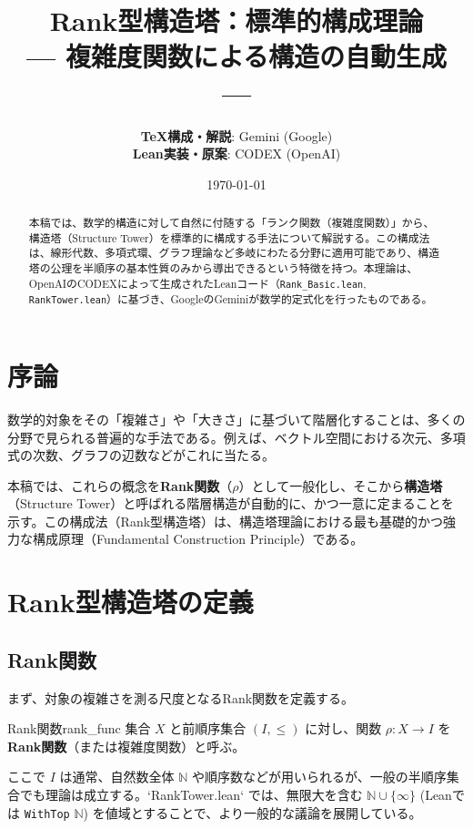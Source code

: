 \documentclass[report, paper=a4, fontsize=11pt, openany]{jlreq}
\title{\textbf{Rank型構造塔：標準的構成理論}\\
\large --- 複雑度関数による構造の自動生成 ---}
\author{
  \textbf{TeX構成・解説}: Gemini (Google) \\
  \textbf{Lean実装・原案}: CODEX (OpenAI)
}
\date{\today}
\newcommand{\N}{\mathbb{N}}
\newcommand{\rank}{\rho}
\begin{document}
\maketitle

\begin{abstract}
本稿では、数学的構造に対して自然に付随する「ランク関数（複雑度関数）」から、構造塔（Structure Tower）を標準的に構成する手法について解説する。この構成法は、線形代数、多項式環、グラフ理論など多岐にわたる分野に適用可能であり、構造塔の公理を半順序の基本性質のみから導出できるという特徴を持つ。本理論は、OpenAIのCODEXによって生成されたLeanコード（\texttt{Rank\_Basic.lean}, \texttt{RankTower.lean}）に基づき、GoogleのGeminiが数学的定式化を行ったものである。
\end{abstract}

\tableofcontents

\chapter{序論}

数学的対象をその「複雑さ」や「大きさ」に基づいて階層化することは、多くの分野で見られる普遍的な手法である。例えば、ベクトル空間における次元、多項式の次数、グラフの辺数などがこれに当たる。

本稿では、これらの概念を\textbf{Rank関数}（$\rank$）として一般化し、そこから\textbf{構造塔}（Structure Tower）と呼ばれる階層構造が自動的に、かつ一意に定まることを示す。この構成法（Rank型構造塔）は、構造塔理論における最も基礎的かつ強力な構成原理（Fundamental Construction Principle）である。

\chapter{Rank型構造塔の定義}

\section{Rank関数}

まず、対象の複雑さを測る尺度となるRank関数を定義する。

\begin{definition}{Rank関数}{rank_func}
集合 $X$ と前順序集合 $(I, \le)$ に対し、関数 $\rank: X \to I$ を\textbf{Rank関数}（または複雑度関数）と呼ぶ。
\end{definition}

ここで $I$ は通常、自然数全体 $\N$ や順序数などが用いられるが、一般の半順序集合でも理論は成立する。`RankTower.lean` では、無限大を含む $\N \cup \{\infty\}$ (Leanでは \texttt{WithTop} $\N$) を値域とすることで、より一般的な議論を展開している。
\end{document}
